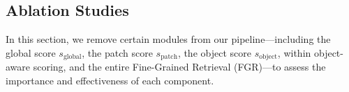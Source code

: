 \begin{table}[h]
\vspace{-6pt}
\centering
{}
\vspace{-10pt}
\caption{Object-Aware Scoring Flexibility.}
\vspace{-20pt}
\label{tab:os flexibility}
\end{table}


\subsection{Ablation Studies}
\label{sec:section4.7}

In this section, we remove certain modules from our pipeline—including the global score \(s_{\text{global}}\),  the patch score \(s_{\text{patch}}\), the object score \(s_{\text{object}}\), within object-aware scoring, and the entire Fine-Grained Retrieval (FGR)—to assess the importance and effectiveness of each component.

